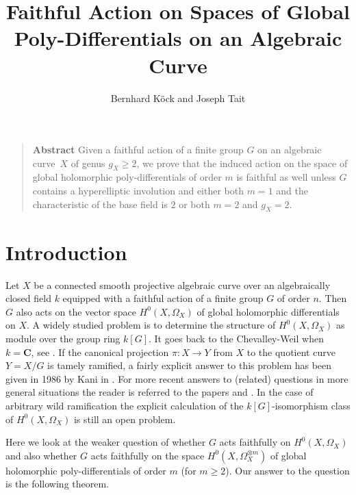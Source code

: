 \documentclass[11pt]{article} %
\title{Faithful Action on Spaces of Global Poly-Differentials on an Algebraic Curve}
\author{Bernhard K\"ock and Joseph Tait}
\theoremstyle{remark}\newtheorem*{rem}{Remark}
\begin{document}
\maketitle

\begin{quote}
 

  {\bf Abstract} Given a faithful action of a finite group $G$ on an algebraic curve~$X$ of genus $g_X\geq 2$, 
we prove that the induced action on the space of global holomorphic poly-differentials of order $m$ is faithful as well 
unless $G$ contains a hyperelliptic involution and either both $m=1$ and the characteristic of the base field is $2$ or both $m=2$ and $g_X=2$.\\
\end{quote}

  \section{Introduction}

  Let $X$ be a connected smooth projective algebraic curve over
an algebraically closed field $k$ equipped with a faithful
action of a finite group $G$ of order $n$. Then $G$ also acts
on the vector space $H^0(X, \Omega_X)$ of global holomorphic
differentials on $X$. A widely studied problem is to determine
the structure of $H^0(X,\Omega_X)$ as module over the group
ring $k[G]$. It goes back to the Chevalley-Weil when $k = \mathbf{C}$,
see \cite{CW}. If the canonical projection $\pi: X \rightarrow
Y$ from $X$ to the quotient curve $Y = X/G$ is tamely ramified,
a fairly explicit answer to this problem has been given in 1986
by Kani in \cite{Ka}. For more recent answers to (related)
questions in more general situations the reader is referred to
the papers \cite{Bo} and \cite{FWK}. In the case of arbitrary
wild ramification the explicit calculation of the
$k[G]$-isomorphism class of $H^0(X,\Omega_X)$ is still an open
problem.

Here we look at the weaker question of whether $G$ acts faithfully on $H^0(X,\Omega_X)$ and also whether $G$ acts faithfully on the space $H^0(X,\Omega_X^{\otimes m})$ of global holomorphic poly-differentials of order $m$ (for $m\geq 2$).
Our answer to the question is the following theorem.
\end{document}
